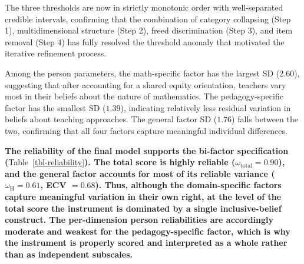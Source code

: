 \documentclass[
  man,
  floatsintext,
  longtable,
  nolmodern,
  notxfonts,
  notimes,
  colorlinks=true,linkcolor=blue,citecolor=blue,urlcolor=blue]{apa7}
\newcommand{\rev}[1]{\textbf{\textcolor{revcol}{#1}}}  %
\begin{document}
\normalsize

The three thresholds are now in strictly monotonic order with
well-separated credible intervals, confirming that the combination of
category collapsing (Step 1), multidimensional structure (Step 2), freed
discrimination (Step 3), and item removal (Step 4) has fully resolved
the threshold anomaly that motivated the iterative refinement process.

Among the person parameters, the math-specific factor has the largest SD
(\(2.60\)), suggesting that after accounting for a shared equity
orientation, teachers vary most in their beliefs about the nature of
mathematics. The pedagogy-specific factor has the smallest SD
(\(1.39\)), indicating relatively less residual variation in beliefs
about teaching approaches. The general factor SD (\(1.76\)) falls
between the two, confirming that all four factors capture meaningful
individual differences.

\rev{The reliability of the final model supports the bi-factor specification (}Table~\ref{tbl-reliability}\rev{). The total score is highly reliable ($\omega_{\text{total}} = 0.90$), and the general factor accounts for most of its reliable variance ($\omega_{\text{H}} = 0.61$, ECV $= 0.68$). Thus, although the domain-specific factors capture meaningful variation in their own right, at the level of the total score the instrument is dominated by a single inclusive-belief construct. The per-dimension person reliabilities are accordingly moderate and weakest for the pedagogy-specific factor, which is why the instrument is properly scored and interpreted as a whole rather than as independent subscales.}
\end{document}

